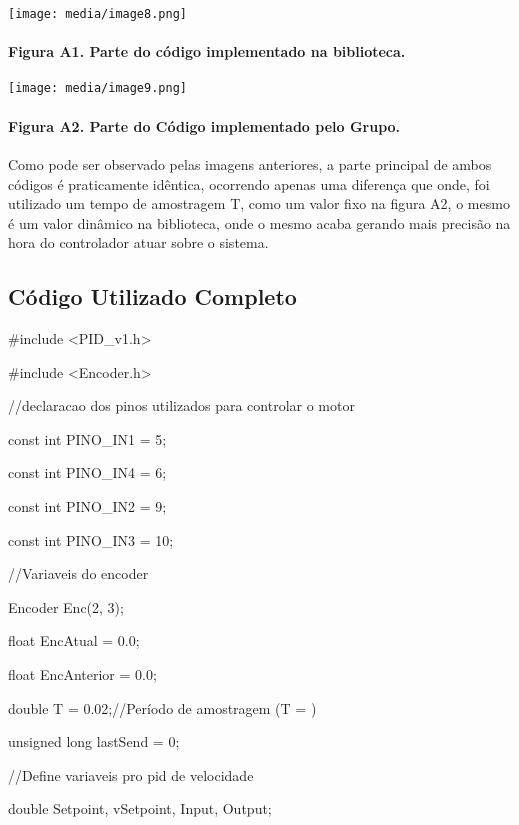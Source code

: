 \documentclass[]{article}
\let\oldparagraph\paragraph
\renewcommand{\paragraph}[1]{\oldparagraph{#1}\mbox{}}
\begin{document}
\texttt{[image: media/image8.png]}

\paragraph{Figura A1. Parte do código implementado na
biblioteca.}\label{figura-a1.-parte-do-cuxf3digo-implementado-na-biblioteca.}

\texttt{[image: media/image9.png]}

\paragraph{Figura A2. Parte do Código implementado pelo
Grupo.}\label{figura-a2.-parte-do-cuxf3digo-implementado-pelo-grupo.}

Como pode ser observado pelas imagens anteriores, a parte principal de
ambos códigos é praticamente idêntica, ocorrendo apenas uma diferença
que onde, foi utilizado um tempo de amostragem T, como um valor fixo na
figura A2, o mesmo é um valor dinâmico na biblioteca, onde o mesmo acaba
gerando mais precisão na hora do controlador atuar sobre o sistema.

\subsection{Código Utilizado
Completo}\label{cuxf3digo-utilizado-completo}

\#include \textless{}PID\_v1.h\textgreater{}

\#include \textless{}Encoder.h\textgreater{}

//declaracao dos pinos utilizados para controlar o motor

const int PINO\_IN1 = 5;

const int PINO\_IN4 = 6;

const int PINO\_IN2 = 9;

const int PINO\_IN3 = 10;

//Variaveis do encoder

Encoder Enc(2, 3);

float EncAtual = 0.0;

float EncAnterior = 0.0;

double T = 0.02;//Período de amostragem (T = )

unsigned long lastSend = 0;

//Define variaveis pro pid de velocidade

double Setpoint, vSetpoint, Input, Output;
\end{document}
